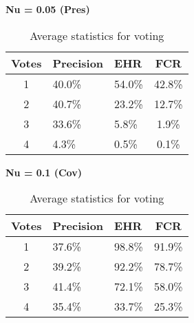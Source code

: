 \begin{table}[h]
  \centering
  \textbf{Nu = 0.05 (Pres)}\vspace{2pt}
  \begin{tabularx}{\columnwidth}{cXXc}
    \toprule
    \textbf{Votes} & \textbf{Precision} & \textbf{EHR} & \textbf{FCR} \\
    \midrule
    1 & 40.0\% & 54.0\% & 42.8\% \\ \hline
    2 & 40.7\% & 23.2\% & 12.7\% \\ \hline
    3 & 33.6\% & 5.8\% & 1.9\% \\ \hline
    4 & 4.3\% & 0.5\% & 0.1\% \\ \hline
    \bottomrule
  \end{tabularx}

  \vspace{4pt}

  \textbf{Nu = 0.1 (Cov)}\vspace{2pt}
  \begin{tabularx}{\columnwidth}{cXXc}
    \toprule
    \textbf{Votes} & \textbf{Precision} & \textbf{EHR} & \textbf{FCR} \\
    \midrule
    1 & 37.6\% & 98.8\% & 91.9\% \\ \hline
    2 & 39.2\% & 92.2\% & 78.7\% \\ \hline
    3 & 41.4\% & 72.1\% & 58.0\% \\ \hline
    4 & 35.4\% & 33.7\% & 25.3\% \\ \hline
    \bottomrule
  \end{tabularx}

  \caption{Average statistics for voting}
  \label{[TABLE] avg_stats_voting}
\end{table}